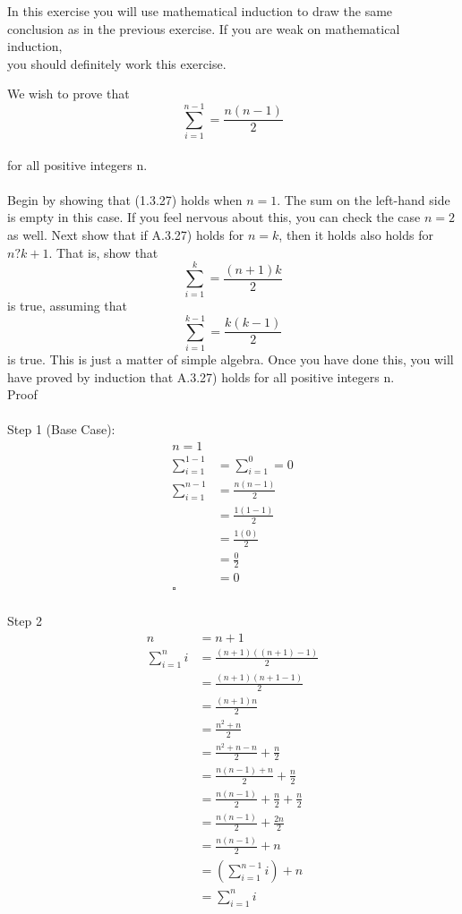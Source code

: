 \documentclass{article}
\begin{document}
	In this exercise you will use mathematical induction to draw the same\\
	conclusion as in the previous exercise. If you are weak on mathematical induction,\\ 
	you should definitely work this exercise.
	
	We wish to prove that\\
	$$\sum_{i=1}^{n-1} = \frac{n(n-1)}{2}$$
	\\
	for all positive integers n.\\
	\\
	Begin by showing that (1.3.27) holds when $n = 1$. The sum on the left-hand side is empty in this case. If you feel nervous about this, you can check the case $n = 2$ as well. Next show that if A.3.27) holds for $n = k$, then it holds also holds for $n ? k + 1$. That is, show that 
	$$\sum_{i=1}^{k} = \frac{(n+1)k}{2}$$
	is true, assuming that\\
	$$\sum_{i=1}^{k-1} = \frac{k(k-1)}{2}$$
	is true. This is just a matter of simple algebra. Once you have done this, you will 
	have proved by induction that A.3.27) holds for all positive integers n.\\
	Proof\\
	\\
	Step 1 (Base Case):
	\begin{align*}
		n = 1\\
		\sum_{i=1}^{1-1} &= \sum_{i=1}^{0} = 0\\
		\sum_{i=1}^{n-1} &= \frac{n(n-1)}{2}\\
		&= \frac{1(1-1)}{2}\\
		&= \frac{1(0)}{2}\\
		&= \frac{0}{2}\\
		&= 0\\
		\square
	\end{align*}
	\\
	Step 2\\
	\begin{align*}
		n &= n + 1\\
		\sum_{i=1}^{n}{i} &= \frac{(n+1)((n+1)-1)}{2}\\
		&= \frac{(n+1)(n+1-1)}{2}\\
		&= \frac{(n+1)n}{2}\\
		&= \frac{n^2+n}{2}\\
		&= \frac{n^2+n-n}{2}+\frac{n}{2}\\
		&= \frac{n(n-1)+n}{2}+\frac{n}{2}\\
		&= \frac{n(n-1)}{2}+\frac{n}{2}+\frac{n}{2}\\
		&= \frac{n(n-1)}{2}+\frac{2n}{2}\\
		&= \frac{n(n-1)}{2}+n\\
		&= (\sum_{i=1}^{n-1}{i})+n\\
		&= \sum_{i=1}^{n}{i}\\		
	\end{align*}
\end{document}

